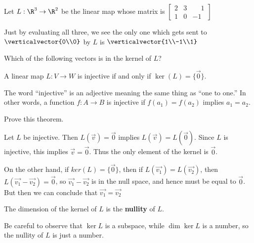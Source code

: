 \documentclass{ximera}
\begin{document}
\begin{question}
	Let $L:\R^3 \to \R^2$ be the linear map whose matrix is 
	\( \begin{bmatrix} 
		2 & 3 & \phantom{-}1\\
		1 & 0 & -1
	\end{bmatrix}\)
	\begin{solution}
		\begin{hint}
			Just by evaluating all three, we see the only one which gets sent to $\verticalvector{0\\0}$ by $L$ is $\verticalvector{1\\-1\\1}$
		\end{hint}
		Which of the following vectors is in the kernel of $L$?
		\begin{multiple-choice}
		\end{multiple-choice}
	\end{solution}
\end{question}

\begin{theorem}
  A linear map $L:V \to W$ is injective if and only if $\ker(L) = \{\vec{0}\}$.
\end{theorem}

\begin{definition}
  The word ``injective'' is an adjective meaning the same thing as ``one to one.''  In other words, a function $f:A \to B$ is injective if $f(a_1)=f(a_2)$ implies $a_1=a_2$.  
\end{definition}

Prove this theorem.
	
\begin{free-response}
	Let $L$ be injective.  Then $L(\vec{v}) = \vec{0}$ implies $L(\vec{v}) = L(\vec{0})$.  Since $L$ is injective, this implies $\vec{v} = \vec{0}$.  Thus the only element
	of the kernel is $\vec{0}$.
	
	On the other hand, if $ker(L) = \{\vec{0}\}$, then if $L(\vec{v_1}) = L(\vec{v_2})$, then $L(\vec{v_1}-\vec{v_2})= \vec{0}$, so $\vec{v_1}-\vec{v_2}$
	 is in the null space, and hence must be equal to $\vec{0}$.  But then we can conclude that $\vec{v_1} = \vec{v_2}$
	\end{free-response}

\begin{definition}
  The dimension of the kernel of $L$ is the \textbf{nullity} of $L$.        
\end{definition}

Be careful to observe that $\ker L$ is a subspace, while $\dim \ker L$
is a number, so the nullity of $L$ is just a number.
\end{document}
